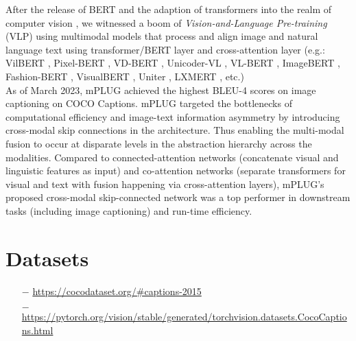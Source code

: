 \documentclass[10pt,twocolumn,letterpaper]{article}
\begin{document}
After the release of BERT \cite{devlin-etal-2019-bert} and the adaption of transformers \cite{vaswani2017attention} into
the realm of computer vision \cite{parmar2018image}, we witnessed a boom of \textit{Vision-and-Language Pre-training}
(VLP) using multimodal models that process and align image and natural language text using transformer/BERT
layer and cross-attention layer (e.g.: VilBERT \cite{lu2019vilbert}, Pixel-BERT \cite{huang2020pixel}, 
VD-BERT \cite{wang2020vd}, 
Unicoder-VL \cite{huang-etal-2019-unicoder}, VL-BERT \cite{su2019vl}, ImageBERT \cite{qi2020imagebert}, 
Fashion-BERT \cite{gao2020fashionbert} , 
VisualBERT \cite{li2019visualbert}, Uniter \cite{chen2020uniter}, LXMERT \cite{tan2019lxmert}, etc.)\\

As of March 2023, mPLUG \cite{li2022mplug} achieved the highest BLEU-4 scores on image captioning on COCO Captions. 
mPLUG targeted the bottlenecks of computational efficiency and image-text information asymmetry by 
introducing cross-modal skip connections in the architecture. Thus enabling the multi-modal fusion to 
occur at disparate levels in the abstraction hierarchy across the modalities. 
Compared to connected-attention networks (concatenate visual and linguistic features as input) and 
co-attention networks (separate transformers for visual and text with fusion happening via cross-attention layers), 
mPLUG's proposed cross-modal skip-connected network was a top performer in downstream 
tasks (including image captioning) and run-time efficiency.

\section{Datasets}

\begin{itemize}
    \item[$-$] \url{https://cocodataset.org/\#captions-2015}
    \item[$-$] \url{https://pytorch.org/vision/stable/generated/torchvision.datasets.CocoCaptions.html}
\end{itemize}


\newpage
{\small


}
\end{document}
